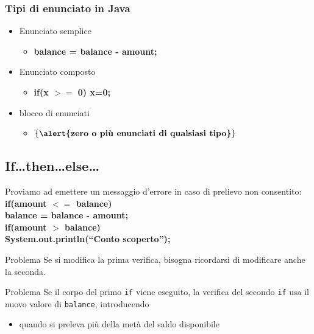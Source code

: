 \begin{frame}
\frametitle{Tipi di enunciato in Java}
\begin{block}{}
\begin{itemize}
\item Enunciato semplice
\begin{itemize}
\item \textbf{balance = balance - amount;}
\end{itemize}
\item Enunciato composto
\begin{itemize}
\item \textbf{if(x $>=$ 0) x=0;}
\end{itemize}
\item blocco di enunciati
\begin{itemize}
\item \textbf{$\left \{ \mbox{\textbf{\alert{zero o più enunciati di qualsiasi tipo}}} \right \}$}
\end{itemize}
\end{itemize}
\end{block}
\end{frame}
\subsection*{If\ldots then\ldots else\ldots}
\begin{frame}
\begin{block}{}
Proviamo ad emettere un messaggio d'errore in caso di prelievo non consentito:\\
\textbf{if(\alert{amount $<=$ balance})}\\
\hspace{0.7cm}\textbf{balance = balance - amount;}\\
\textbf{if(\alert{amount $>$ balance})} \\
\hspace{0.7cm}\textbf{System.out.println(``Conto scoperto'');} 
\end{block}
\begin{block}{Problema}
Se si modifica la prima verifica, bisogna ricordarsi di modificare anche la seconda.
\end{block}
\begin{block}{Problema}
Se il corpo del primo \texttt{if} viene eseguito, la verifica del secondo \texttt{if} usa il nuovo valore di \texttt{balance},
introducendo \textbf{}
\begin{itemize}
\item quando si preleva più della metà del saldo disponibile
\end{itemize}
\end{block}
\end{frame}

